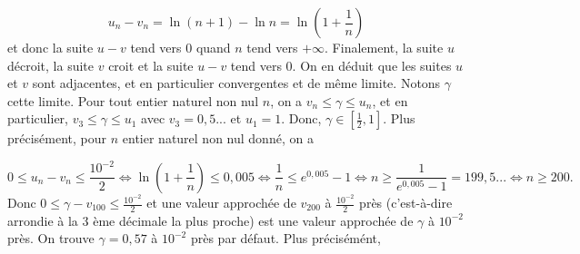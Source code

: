 {\begin{enumerate}
{$$u_n-v_n=\ln(n+1)-\ln n=\ln\left(1+\frac{1}{n}\right)$$ 
et donc la suite $u-v$ tend vers 0 quand $n$ tend vers $+\infty$.
Finalement, la suite $u$ décroit, la suite $v$ croit et la suite $u-v$ tend vers $0$. On en déduit que les suites $u$ et $v$ sont adjacentes, et en particulier convergentes et de même limite. Notons $\gamma$ cette limite.
Pour tout entier naturel non nul $n$, on a $v_n\leq\gamma\leq u_n$, et en particulier, $v_3\leq\gamma\leq u_1$ avec $v_3=0,5...$ et $u_1=1$. Donc, $\gamma\in\left[\frac{1}{2},1\right]$.
Plus précisément, pour $n$ entier naturel non nul donné, on a

$$0\leq u_n-v_n\leq\frac{10^{-2}}{2}\Leftrightarrow\ln\left(1+\frac{1}{n}\right)\leq0,005\Leftrightarrow\frac{1}{n}\leq e^{0,005}-1\Leftrightarrow n\geq\frac{1}{e^{0,005}-1}=199,5...\Leftrightarrow n\geq200.$$
Donc $0\leq\gamma-v_{100}\leq\frac{10^{-2}}{2}$ et une valeur approchée de $v_{200}$ à $\frac{10^{-2}}{2}$ près (c'est-à-dire arrondie à la 3 ème décimale la plus proche) est une valeur approchée de $\gamma$ à $10^{-2}$ près. On trouve $\gamma=0,57$ à $10^{-2}$ près par défaut. Plus précisémént,

\begin{center}
\end{center}}
\end{enumerate}
}